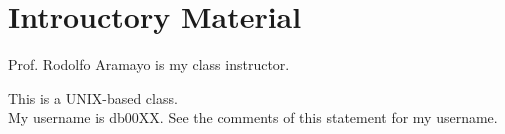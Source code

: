 








\chapter{Introuctory Material}
\label{chp:SWEngrBasics}

Prof. Rodolfo Aramayo is my class instructor.

This is a UNIX-based class. \\

My username is db00XX. See the comments of this statement for my username. \\ %


